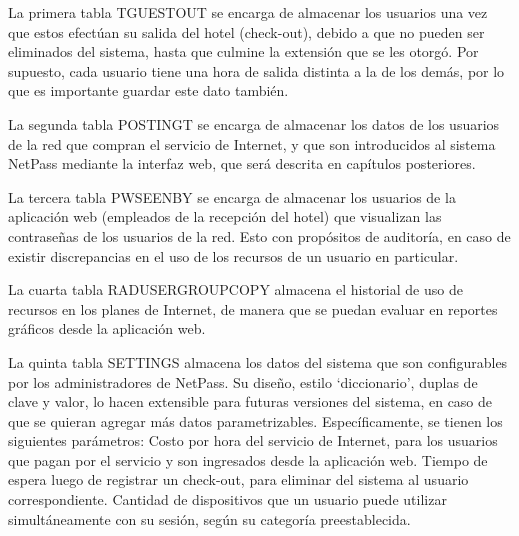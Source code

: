 		La primera tabla TGUESTOUT se encarga de almacenar los usuarios una vez que estos efectúan su salida del hotel (check-out), debido a que no pueden ser eliminados del sistema, hasta que culmine la extensión que se les otorgó. Por supuesto, cada usuario tiene una hora de salida distinta a la de los demás, por lo que es importante guardar este dato también.
\newline		
		
		La segunda tabla POSTINGT se encarga de almacenar los datos de los usuarios de la red que compran el servicio de Internet, y que son introducidos al sistema NetPass mediante la interfaz web, que será descrita en capítulos posteriores.
\newline		

		La tercera tabla PWSEENBY se encarga de almacenar los usuarios de la aplicación web (empleados de la recepción del hotel) que visualizan las contraseñas de los usuarios de la red. Esto con propósitos de auditoría, en caso de existir discrepancias en el uso de los recursos de un usuario en particular.
\newline
		
		La cuarta tabla RADUSERGROUPCOPY almacena el historial de uso de recursos en los planes de Internet, de manera que se puedan evaluar en reportes gráficos desde la aplicación web.
		
		La quinta tabla SETTINGS almacena los datos del sistema que son configurables por los administradores de NetPass. Su diseño, estilo ‘diccionario’, duplas de clave y valor, lo hacen extensible para futuras versiones del sistema, en caso de que se quieran agregar más datos parametrizables. Específicamente, se tienen los siguientes parámetros: Costo por hora del servicio de Internet, para los usuarios que pagan por el servicio y son ingresados desde la aplicación web. Tiempo de espera luego de registrar un check-out, para eliminar del sistema al usuario correspondiente. Cantidad de dispositivos que un usuario puede utilizar simultáneamente con su sesión, según su categoría preestablecida.

		
